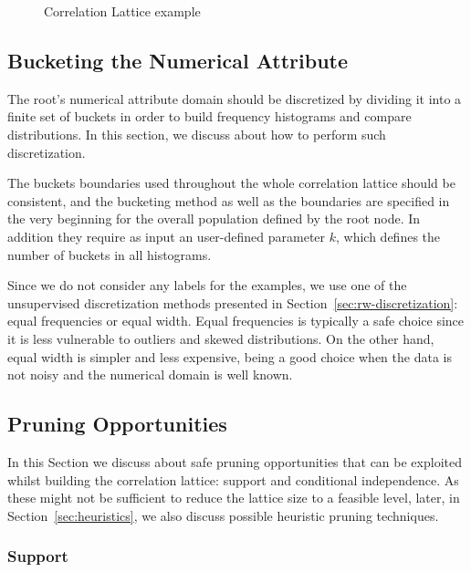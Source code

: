 \begin{figure}[!h]
  \caption{Correlation Lattice example}
  \centering
  \begin{tikzpicture}
  [scale=1.8,auto=center,every node/.style={draw=black, font=\tiny}]
  
  \end{tikzpicture}
  \label{fig:lattice}
\end{figure}

\subsection{Bucketing the Numerical Attribute}

The root's numerical attribute domain should be discretized by dividing it into a finite set of buckets in
order to build frequency histograms and compare distributions. In this section, we discuss about how to perform
such discretization.

The buckets boundaries used throughout the whole correlation lattice should be consistent, and the bucketing method as
well as the boundaries are specified in the very beginning for the overall population defined by the root node. In
addition they require as input an user-defined parameter $k$, which defines the number of buckets in all histograms.

Since we do not consider any labels for the examples, we use one of the unsupervised discretization methods presented
in Section~\ref{sec:rw-discretization}: equal frequencies or equal width. Equal frequencies is typically a safe choice
since it is less vulnerable to outliers and skewed distributions. On the other hand, equal width is simpler and less
expensive, being a good choice when the data is not noisy and the numerical domain is well known.

\subsection{Pruning Opportunities}

In this Section we discuss about safe pruning opportunities that can be exploited whilst building the correlation
lattice: support and conditional independence. As these might not be sufficient to reduce the lattice size to a feasible
level, later, in Section~\ref{sec:heuristics}, we also discuss possible heuristic pruning techniques.

\subsubsection{Support}

